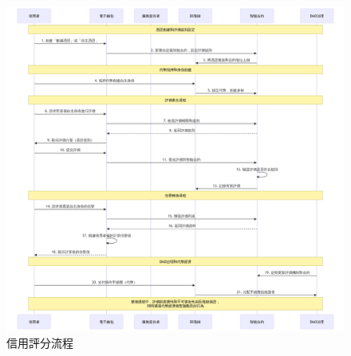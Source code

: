 \clearpage
\begin{figure}[p]
  \centering
  \includegraphics[width=\linewidth]{figures/credit-uml.png}
  \caption{信用評分流程}
  \label{fig:appendix-credit-uml}
\end{figure}

